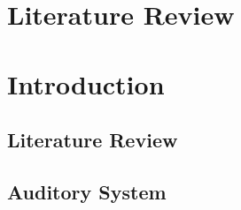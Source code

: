 \documentclass[10pt,a4paper,twoside,openright]{book}
\begin{document}
		{%
			\singlespacing%
			\tableofcontents%
			\listoffigures%
			\listoftables
                        \printglossaries
		   \clearpage%
		}%

\setcounter{chapter}{0}
\chapter{Literature Review}

\medskip{}





\chapter{Introduction}\label{Ch1:introduction}




\graphicspath{{../../figures/}{./gfx/}{/media/data/Work/thesis/SimpleResponsesChapter/}{/media/data/Work/thesis/SimpleResponsesChapter/gfx/}{/media/data/Work/cnstellate/}{/media/data/Work/cnstellate/golgi/}{/media/data/Work/cnstellate/}{/media/data/Work/cnstellate/TV_Notch/}}



\section{Literature Review}\label{Ch1:litreview}

\section{Auditory System}\label{Ch1:AuditorySystem}

%
\end{document}
